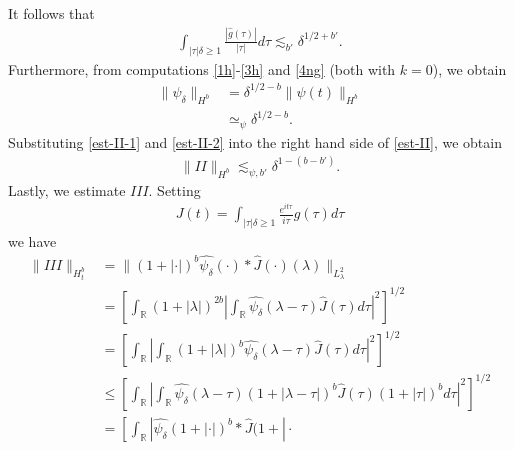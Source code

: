 \documentclass[12pt,reqno]{amsart}
\numberwithin{equation}{section}  %
\newcommand{\rr}{\mathbb{R}}
\newcommand{\wh}{\widehat}
\begin{document}
\begin{appendices}
\begin{equation*}
\end{equation*}
%
It follows that
%
%
\begin{equation}
  \label{est-II-1}
\begin{split}
\int_{| \tau |\delta \ge 1} \frac{| \wh{g}(\tau)|}{ |\tau|} d \tau 
\lesssim_{b'} \delta^{1/2 + b'}.
\end{split}
\end{equation}
%
%
%
Furthermore, from computations \eqref{1h}-\eqref{3h} and \eqref{4ng} (both with
$k=0$), we obtain 
%
\begin{equation}
  \label{est-II-2}
\begin{split}
  \| \psi_{\delta} \|_{H^{b}}
  & = \delta^{1/2 - b} \| \psi(t) \|_{H^{b}}
  \\
  & \simeq_{\psi} \delta^{1/2 -b}.
\end{split}
\end{equation}
%
%
Substituting \eqref{est-II-1} and \eqref{est-II-2} into the right hand side of
\eqref{est-II}, we obtain
%
%
\begin{equation}
  \label{rom-2}
\begin{split}
  \| II \|_{H^{b}} \lesssim_{\psi, b'} \delta^{1 - (b - b')}.
\end{split}
\end{equation}
%
%
Lastly, we estimate $III$. Setting 
%
%
\begin{equation*}
\begin{split}
J(t) = \int_{| \tau |\delta \ge 1}
  \frac{e^{it \tau}}{i \tau}\wh{g}(\tau) d \tau
\end{split}
\end{equation*}
%
%
we have
%
%
\begin{equation*}
\begin{split}
  \| III \|_{H^{b}_{t}}
  & = \| (1 + | \cdot |)^{b} \wh{\psi_{\delta}}(\cdot) *
  \wh{J}(\cdot) (\lambda) \|_{L^{2}_{\lambda}}
  \\
  & = \left[ \int_{\rr} (1 + | \lambda |)^{2b} | \int_{\rr}
  \wh{\psi_{\delta}}(\lambda - \tau) \wh{J}(\tau) d \tau |^{2} \right]^{1/2}
  \\
  & = \left[ \int_{\rr}  | \int_{\rr}
 (1 + | \lambda |)^{b} \wh{\psi_{\delta}}(\lambda - \tau) \wh{J}(\tau) d \tau |^{2} \right]^{1/2}
  \\
  & \le \left[ \int_{\rr}  | \int_{\rr}
  \wh{\psi_{\delta}}(\lambda - \tau) (1 + | \lambda - \tau |)^{b} \wh{J}(\tau)
  (1 + | \tau |)^{b}  d \tau |^{2} \right]^{1/2}
  \\
  & = \left[ \int_{\rr} | \wh{\psi_{\delta}}(1 + | \cdot |)^{b} * \wh{J}(1 + | \cdot

\end{split}
\end{equation*}
\end{appendices}
\end{document}
